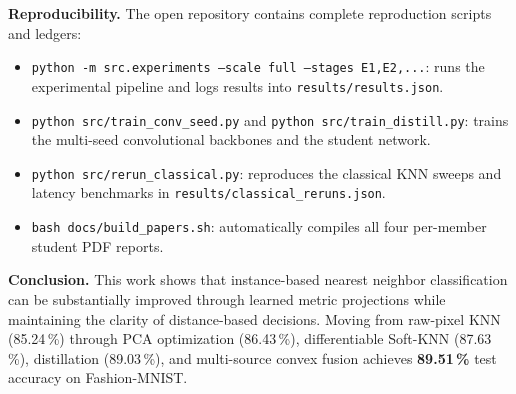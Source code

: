 \documentclass[10pt,a4paper]{article}
\newcommand{\file}[1]{\nolinkurl{#1}}
\begin{document}
\textbf{Reproducibility.} The open repository contains complete reproduction scripts and ledgers:
\begin{itemize}[leftmargin=1.4em]
\item \texttt{python -m src.experiments --scale full --stages E1,E2,...}: runs the experimental pipeline and logs results into \file{results/results.json}.
\item \texttt{python src/train\_conv\_seed.py} and \texttt{python src/train\_distill.py}: trains the multi-seed convolutional backbones and the student network.
\item \texttt{python src/rerun\_classical.py}: reproduces the classical KNN sweeps and latency benchmarks in \file{results/classical_reruns.json}.
\item \texttt{bash docs/build\_papers.sh}: automatically compiles all four per-member student PDF reports.
\end{itemize}

\textbf{Conclusion.} This work shows that instance-based nearest neighbor classification can be substantially improved through learned metric projections while maintaining the clarity of distance-based decisions. Moving from raw-pixel KNN (85.24\,\%) through PCA optimization (86.43\,\%), differentiable Soft-KNN (87.63\,\%), distillation (89.03\,\%), and multi-source convex fusion achieves \textbf{89.51\,\%} test accuracy on Fashion-MNIST.
\end{document}
